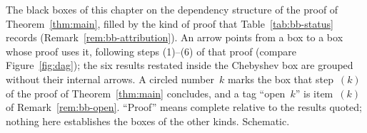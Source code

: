 \caption{The black boxes of this chapter on the dependency structure of
the proof of Theorem~\ref{thm:main}, filled by the kind of proof that
Table~\ref{tab:bb-status} records (Remark~\ref{rem:bb-attribution}).
An arrow points from a box to a box whose proof uses it, following
steps (1)--(6) of that proof (compare Figure~\ref{fig:dag}); the six
results restated inside the Chebyshev box are grouped without their
internal arrows. A circled number~$k$ marks the box that step~$(k)$ of the proof of
Theorem~\ref{thm:main} concludes, and a tag ``open~$k$'' is
item~$(k)$ of Remark~\ref{rem:bb-open}. ``Proof'' means complete
relative to the results quoted; nothing here establishes the boxes of
the other kinds. Schematic.}
\label{fig:bb-status-map}
